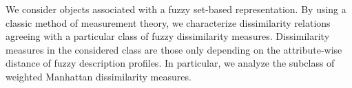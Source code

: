 

We consider objects associated with a fuzzy set-based
representation. By using a classic method of measurement
theory, we characterize dissimilarity relations agreeing with a particular class of fuzzy dissimilarity
measures. Dissimilarity measures in the considered class are those only depending on the attribute-wise distance of fuzzy description profiles. In particular, we analyze the subclass of weighted Manhattan dissimilarity measures.


